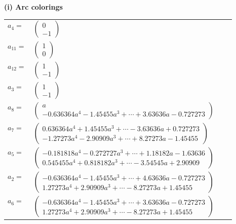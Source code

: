 \documentclass[1p]{elsarticle_modified}
\theoremstyle{definition}
\begin{document}
\flushleft \textbf{(i) Arc colorings}\\
\begin{tabular}{m{7pt} m{180pt} m{7pt} m{180pt} }
\flushright $a_{4}=$&$\begin{pmatrix}0\\-1\end{pmatrix}$ \\
\flushright $a_{11}=$&$\begin{pmatrix}1\\0\end{pmatrix}$ \\
\flushright $a_{12}=$&$\begin{pmatrix}1\\-1\end{pmatrix}$ \\
\flushright $a_{3}=$&$\begin{pmatrix}1\\-1\end{pmatrix}$ \\
\flushright $a_{8}=$&$\begin{pmatrix}a\\-0.636364 a^{4}-1.45455 a^{3}+\cdots+3.63636 a-0.727273\end{pmatrix}$ \\
\flushright $a_{7}=$&$\begin{pmatrix}0.636364 a^{4}+1.45455 a^{3}+\cdots-3.63636 a+0.727273\\-1.27273 a^{4}-2.90909 a^{3}+\cdots+8.27273 a-1.45455\end{pmatrix}$ \\
\flushright $a_{5}=$&$\begin{pmatrix}-0.181818 a^{4}-0.272727 a^{3}+\cdots+1.18182 a-1.63636\\0.545455 a^{4}+0.818182 a^{3}+\cdots-3.54545 a+2.90909\end{pmatrix}$ \\
\flushright $a_{2}=$&$\begin{pmatrix}-0.636364 a^{4}-1.45455 a^{3}+\cdots+4.63636 a-0.727273\\1.27273 a^{4}+2.90909 a^{3}+\cdots-8.27273 a+1.45455\end{pmatrix}$ \\
\flushright $a_{6}=$&$\begin{pmatrix}-0.636364 a^{4}-1.45455 a^{3}+\cdots+3.63636 a-0.727273\\1.27273 a^{4}+2.90909 a^{3}+\cdots-8.27273 a+1.45455\end{pmatrix}$ \\

\end{tabular}
\end{document}
